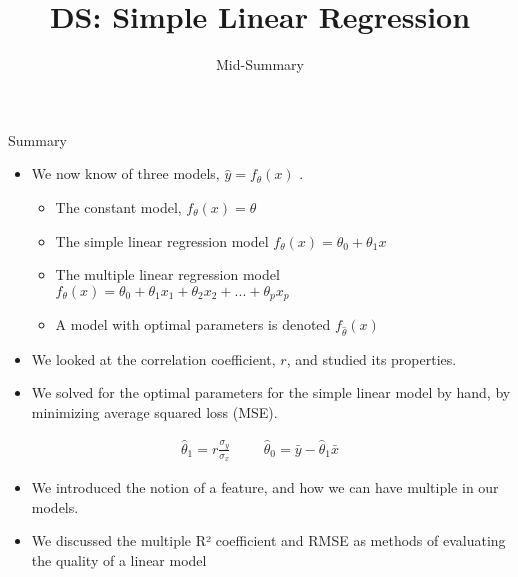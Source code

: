 \documentclass[aspectratio=169]{../latex_main/tntbeamer}  %
\title[Regression]{DS: Simple Linear Regression}
\subtitle{Mid-Summary}
\begin{document}
	
	\maketitle
	\begin{frame}{Summary}
	    \begin{itemize}
	        \item We now know of three models, $\hat{y} = f_\theta (x)$             .
	        \begin{itemize}
	            \item The constant model,  $f_\theta (x) = \theta$ 
                \item The simple linear regression model  $f_\theta (x) = \theta_0 +  \theta_1x$ 
                \item The multiple linear regression model	 $f_\theta (x) = \theta_0 + \theta_1 x_1 + \theta_2 x_2 + ... + \theta_p x_p$
                \item A model with optimal parameters is denoted $f_\hat{\theta} (x)$
	        \end{itemize}
            
            \item We looked at the correlation coefficient, $r$, and studied its properties.
	        \item We solved for the optimal parameters for the simple linear model by hand, by minimizing average squared loss (MSE).
	    \end{itemize}
	    \begin{align*}
	        \hat{\theta}_1 = r \frac{\sigma_y}{\sigma_x} \hspace{1cm} \hat{\theta}_0 = \bar{y} - \hat{\theta}_1 \bar{x}
	    \end{align*}
	    \begin{itemize}
	        \item We introduced the notion of a feature, and how we can have multiple in our models.
	        \item We discussed the multiple R² coefficient and RMSE as methods of evaluating the quality of a linear model
	    \end{itemize}
	\end{frame}
	
	
	
\end{document}
